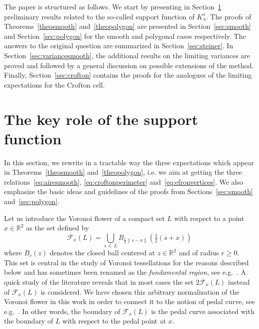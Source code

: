 \documentclass[10pt]{amsart}
\theoremstyle{definition}\newtheorem{defi}[theo]{Definition}\newtheorem{rema}[theo]{Remark}\newtheorem{exam}[theo]{Example}\newtheorem{exem}[theo]{Example}\newtheorem{nota}[theo]{Notation}
\newcommand{\cF}{\mathcal{F}}
\newcommand{\R}{\mathbb{R}}
\newcommand{\pass}{\vspace{0.3cm}\noindent}
\newcommand{\noi}{\noindent}
\begin{document}
The paper is structured as follows. We start by presenting in Section~\ref{sec:keytools} preliminary results related to the so-called support function of $K_{\lambda}^o$. The proofs of Theorems~\ref{theosmooth} and~\ref{theopolygon} are presented in Section~\ref{sec:smooth} and Section~\ref{sec:polygon} for the smooth and polygonal cases respectively. The answers to the original question are summarized in Section~\ref{sec:steiner}. In Section~\ref{sec:variancesmooth}, the additional results on the limiting variances are proved and followed by a general discussion on possible extensions of the method. Finally, Section~\ref{sec:crofton} contains the proofs for the analogues of the limiting expectations for the Crofton cell.



\section{The key role of the support function}\label{sec:keytools}

In this section, we rewrite in a tractable way the three expectations which appear in Theorems~\ref{theosmooth} and~\ref{theopolygon}, i.e. we aim at getting the three relations~\eqref{eq:airesmooth}, \eqref{eq:croftonperimeter} and~\eqref{eq:efronvertices}. We also emphasize the basic ideas and guidelines of the proofs from Sections~\ref{sec:smooth} and~\ref{sec:polygon}.

Let us introduce the Voronoi flower of a compact set $L$ with respect to a point $x\in\R^2$ as the set defined by
\begin{equation}\label{def:vorflow}
\cF_x(L)= \bigcup_{s\,\in\,L} B_{\frac1{2}\|s-x\|}\left(\tfrac1{2}(s+x)\right)
\end{equation}
where $B_r(z)$ denotes the closed ball centered at $z\in \R^2$ and of radius $r\ge 0$. This set is central in the study of Voronoi tessellations for the reasons described below and has sometimes been renamed as the \emph{fundamental region}, see e.g.~\cite{zuyev}. A quick study of the literature reveals that in most cases the set $2\cF_x(L)$ instead of $\cF_x(L)$ is considered. We have chosen this arbitrary normalization of the Voronoi flower in this work in order to connect it to the notion of pedal curve, see e.g.~\cite[Chapter~11]{zwikker}. In other words, the boundary of $\cF_x(L)$ is the pedal curve associated with the boundary of $L$ with respect to the pedal point at $x$.
\end{document}
